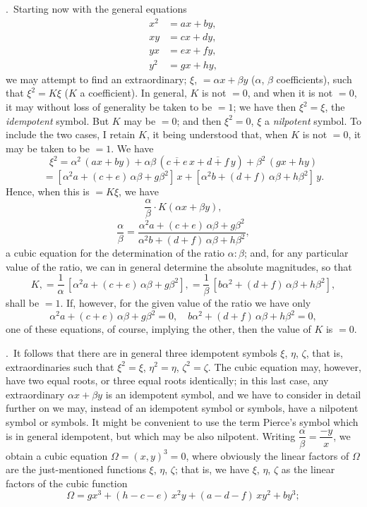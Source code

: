 \documentclass[11pt,a4paper]{article}
\begin{document}
.\ Starting now with the general equations
\[
\begin{aligned}
x^{2} &= ax + by,\\
xy    &= cx + dy,\\
yx    &= ex + fy,\\
y^{2} &= gx + hy,
\end{aligned}
\]
we may attempt to find an extraordinary; $\xi$, $= \alpha x + \beta y$ ($\alpha$, $\beta$ coefficients), such that $\xi^{2} = K\xi$ ($K$ a coefficient).  In general, $K$ is not $= 0$, and when it is not $= 0$, it may without loss of generality be taken to be $= 1$; we have then $\xi^{2} = \xi$, the \textit{idempotent} symbol.  But $K$ may be $= 0$; and then $\xi^{2} = 0$, $\xi$ a \textit{nilpotent} symbol.  To include the two cases, I retain $K$, it being understood that, when $K$ is not $= 0$, it may be taken to be $= 1$.  We have
\[
\xi^{2} = \alpha^{2}\,(ax + by) + \alpha\beta\,(\overline{c + e}\,x + \overline{d + f}\,y) + \beta^{2}\,(gx + hy)
\]
\[
= [\alpha^{2}a + (c + e)\,\alpha\beta + g\beta^{2}]\,x + [\alpha^{2}b + (d + f)\,\alpha\beta + h\beta^{2}]\,y.
\]
Hence, when this is $= K\xi$, we have
\[
\frac{\alpha}{\beta} \cdot K(\alpha x + \beta y),
\]
\[
\frac{\alpha}{\beta} = \frac{\alpha^{2}a + (c + e)\,\alpha\beta + g\beta^{2}}{\alpha^{2}b + (d + f)\,\alpha\beta + h\beta^{2}},
\]
a cubic equation for the determination of the ratio $\alpha : \beta$; and, for any particular value of the ratio, we can in general determine the absolute magnitudes, so that
\[
K, = \frac{1}{\alpha}\,[\alpha^{2}a + (c + e)\,\alpha\beta + g\beta^{2}], = \frac{1}{\beta}\,[b\alpha^{2} + (d + f)\,\alpha\beta + h\beta^{2}],
\]
shall be $= 1$.  If, however, for the given value of the ratio we have only
\[
\alpha^{2}a + (c + e)\,\alpha\beta + g\beta^{2} = 0,\quad b\alpha^{2} + (d + f)\,\alpha\beta + h\beta^{2} = 0,
\]
one of these equations, of course, implying the other, then the value of $K$ is $= 0$.

.\ It follows that there are in general three idempotent symbols $\xi$, $\eta$, $\zeta$, that is, extraordinaries such that $\xi^{2} = \xi$, $\eta^{2} = \eta$, $\zeta^{2} = \zeta$.  The cubic equation may, however, have two equal roots, or three equal roots identically; in this last case, any extraordinary $\alpha x + \beta y$ is an idempotent symbol, and we have to consider in detail further on we may, instead of an idempotent symbol or symbols, have a nilpotent symbol or symbols.  It might be convenient to use the term Pierce's symbol which is in general idempotent, but which may be also nilpotent.  Writing $\dfrac{\alpha}{\beta} = \dfrac{-y}{x}$, we obtain a cubic equation $\Omega = (x, y)^{3} = 0$, where obviously the linear factors of $\Omega$ are the just-mentioned functions $\xi$, $\eta$, $\zeta$; that is, we have $\xi$, $\eta$, $\zeta$ as the linear factors of the cubic function
\[
\Omega = gx^{3} + (h - c - e)\,x^{2}y + (a - d - f)\,xy^{2} + by^{3};
\]
\clearpage
\end{document}
